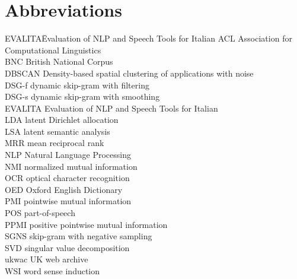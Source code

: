 \documentclass[output=paper]{langsci/langscibook}
\begin{document}
\section*{Abbreviations}
\begin{tabbing}
EVALITA\hspace{1em}\= Evaluation of NLP and Speech Tools for Italian\kill
ACL \> Association for Computational Linguistics\\
BNC \> British National Corpus\\
DBSCAN \> Density-based spatial clustering of applications with noise\\
DSG-f \> dynamic skip-gram with filtering\\
DSG-s \> dynamic skip-gram with smoothing\\
EVALITA \> Evaluation of NLP and Speech Tools for Italian\\
LDA \> latent Dirichlet allocation \\
LSA \> latent semantic analysis\\
MRR \> mean reciprocal rank\\
NLP \> Natural Language Processing\\
NMI \> normalized mutual information\\
OCR \> optical character recognition\\
OED \> Oxford English Dictionary\\
PMI \> pointwise mutual information\\
POS \> part-of-speech\\
PPMI \> positive pointwise mutual information\\
SGNS \> skip-gram with negative sampling\\
SVD \> singular value decomposition\\
ukwac \> UK web archive\\
WSI \> word sense induction
\end{tabbing}

{\sloppy\printbibliography[heading=subbibliography,notkeyword=this]}
\end{document}
